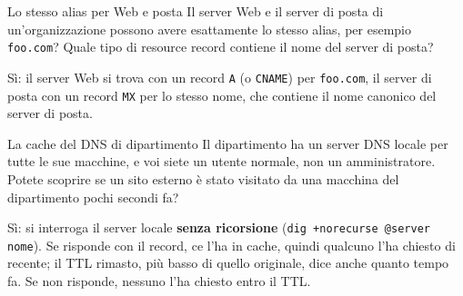 \begin{esercizio}{Lo stesso alias per Web e posta}
Il server Web e il server di posta di un'organizzazione possono avere esattamente lo stesso alias, per esempio \texttt{foo.com}? Quale
tipo di resource record contiene il nome del server di posta?

\svolgimento
Sì: il server Web si trova con un record \texttt{A} (o \texttt{CNAME}) per \texttt{foo.com}, il server di posta con un record
\texttt{MX} per lo stesso nome, che contiene il nome canonico del server di posta.
\end{esercizio}

\begin{esercizio}{La cache del DNS di dipartimento}
Il dipartimento ha un server DNS locale per tutte le sue macchine, e voi siete un utente normale, non un amministratore. Potete scoprire
se un sito esterno è stato visitato da una macchina del dipartimento pochi secondi fa?

\svolgimento
Sì: si interroga il server locale \textbf{senza ricorsione} (\texttt{dig +norecurse @server nome}). Se risponde con il record, ce l'ha
in cache, quindi qualcuno l'ha chiesto di recente; il TTL rimasto, più basso di quello originale, dice anche quanto tempo fa. Se non
risponde, nessuno l'ha chiesto entro il TTL.
\end{esercizio}

